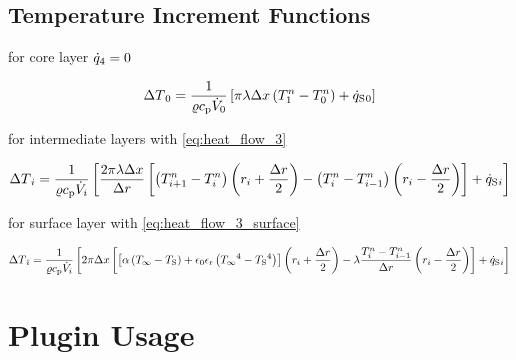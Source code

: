 \documentclass{scrartcl}
\begin{document}
    \subsection{Temperature Increment Functions}

    for core layer ${\dot{q}}_4 = 0$

    \begin{equation}
        {\Delta T}_0 = \frac{1}{{\varrho}{c_\mathrm{p}}{\dot{V}}_0} \left[ \pi {\lambda} {\Delta x} \left( {T}_1^{n} - {T}_0^{n} \right) + {\dot{q}_\mathrm{S}}{}_0 \right]
        \label{eq:increment_core}
    \end{equation}

    for intermediate layers with \autoref{eq:heat_flow_3}

    \begin{equation}
        {\Delta T}_{i} = \frac{1}{{\varrho}{c_\mathrm{p}}{\dot{V}}_{i}}
        \left[
            \frac{2 \pi {\lambda} {\Delta x}}{{\Delta r}} \left[
                \left( {T}_{{i}+1}^{n} - {T}_{i}^{n} \right)
                \left( {r}_{i} + \frac{{\Delta r}}{2} \right)
                -\left( {T}_{{i}}^{n} - {T}_{{i}-1}^{n} \right)
                \left( {r}_{i} - \frac{{\Delta r}}{2} \right)
                \right]
            + {\dot{q}_\mathrm{S}}{}_{i}
            \right]
        \label{eq:increment_layer}
    \end{equation}

    for surface layer with \autoref{eq:heat_flow_3_surface}

    \begin{equation}
        {\Delta T}_{\hat{\imath}} = \frac{1}{{\varrho}{c_\mathrm{p}}{\dot{V}}_{i}}
        \left[
        2 \pi {\Delta x} \left[
        \left[ {\alpha} \left( {T_\infty} - {T_\mathrm{S}} \right) + {\epsilon_0}{\epsilon_\mathrm{r}}\left( {T_\infty}^4 - {T_\mathrm{S}}^4 \right) \right]
        \left( {r}_{i} + \frac{{\Delta r}}{2} \right)
        -{\lambda} \frac{{T}_{{i}}^{n} - {T}_{{i}-1}^{n}}{{\Delta r}}
        \left( {r}_{i} - \frac{{\Delta r}}{2} \right)
        \right]
        + {\dot{q}_\mathrm{S}}{}_{{i}}
        \right]
        \label{eq:increment_surface}
    \end{equation}


    \section{Plugin Usage}\label{sec:plugin-usage}

    

    \printbibliography
\end{document}
